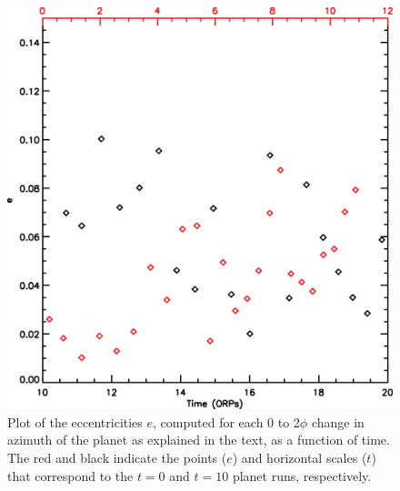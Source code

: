 \documentclass[12pt,manuscript,authoryear]{aastex}
\begin{document}
\begin{figure}[t]
\center
\includegraphics[width=12cm]{Figures/planete.eps}
\caption{Plot of the eccentricities $e$, computed for each 0 to 2$\phi$ change in azimuth of the planet as explained in the text, as a function of time. The red and black indicate the points ($e$) and horizontal scales ($t$) that correspond to the $t = 0$ and $t = 10$ planet runs, respectively.}
\label{fig:e}
\end{figure}


\label{lastpage}
\end{document}
